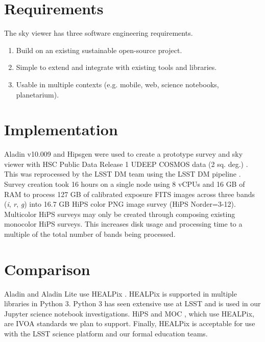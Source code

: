 \documentclass[11pt,twoside]{article}
\begin{document}

\section{Requirements}
The sky viewer has three software engineering requirements.
\begin{enumerate}
\item Build on an existing sustainable open-source project.
\item Simple to extend and integrate with existing tools and libraries.
\item Usable in multiple contexts (e.g. mobile, web, science notebooks, planetarium).
\end{enumerate}

\section{Implementation}
Aladin v10.009 and Hipsgen were used to create a prototype survey and sky viewer with HSC Public Data Release 1 UDEEP COSMOS data (2 sq. deg.) \citep{2017arXiv170208449A}. This was reprocessed by the LSST DM team using the LSST DM pipeline \citep{2015arXiv151207914J}. Survey creation took 16 hours on a single node using 8 vCPUs and 16 GB of RAM to process 127 GB of calibrated exposure FITS images across three bands (\emph{i}, \emph{r}, \emph{g}) into 16.7 GB HiPS \citep{2015A&A...578A.114F} color PNG image survey (HiPS Norder=3-12). Multicolor HiPS surveys may only be created through composing existing monocolor HiPS surveys. This increases disk usage and processing time to a multiple of the total number of bands being processed.

\section{Comparison}
Aladin and Aladin Lite use HEALPix \citep{2007MNRAS.381..865C}. HEALPix is supported in multiple libraries in Python 3. Python 3 has seen extensive use at LSST \citep{P1-123_adassxxvii} and is used in our Jupyter \citep{PER-GRA:2007} science notebook investigations. HiPS and MOC \citep{2015A&A...578A.114F}, which use HEALPix, are IVOA standards we plan to support. Finally, HEALPix is acceptable for use with the LSST science platform \citep{2017LSST.1.LDM-542} and our formal education teams.
\end{document}

